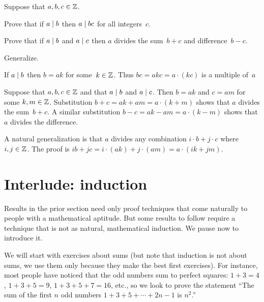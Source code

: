 \documentclass{ibl}
\begin{document}
\begin{ex}  \label{ex:DividesAndLinearCombinations}
Suppose that $a,b,c\in\mathbb{Z}$.
\begin{exes}
\item Prove that if $a\mid b$ then $a\mid bc$ for all integers~$c$.
\item Prove that if $a\mid b$ and $a\mid c$ then $a$ divides the 
  sum~$b+c$ and difference~$b-c$.
\item Generalize.
\end{exes}
\begin{ans}
\begin{exes}
\item If $a\mid b$ then $b=ak$ for some~$k\in\mathbb{Z}$.
  Thus $bc=akc=a\cdot(kc)$ is a multiple of~$a$
\item Suppose that $a,b,c\in\mathbb{Z}$ and that $a\mid b$ and $a\mid c$.
  Then $b=ak$ and $c=am$ for some $k,m\in\mathbb{Z}$. 
  Substitution  
  $b+c=ak+am=a\cdot(k+m)$
  shows that $a$ divides the sum~$b+c$.
  A similar substitution
  $b-c=ak-am=a\cdot(k-m)$
  shows that $a$ divides the difference.
\item A natural generalization is that $a$ divides any combination
  $i\cdot b+j\cdot c$ where $i,j\in\mathbb{Z}$.
  The proof is
  $ib+jc=i\cdot (ak)+j\cdot(am)=a\cdot(ik+jm)$.
\end{exes}
\end{ans}
\end{ex}




\section{Interlude: induction}
Results in the prior section need only proof techniques that come naturally
to people with a mathematical aptitude.
But some results to follow require a technique 
that is not as natural, mathematical induction.
We pause now to introduce it.

We will start with exercises about sums 
(but note that induction is not about sums,
we use them only because they make the best first exercises).
For instance, most people have noticed that the odd numbers sum to 
perfect squares: $1+3=4$, $1+3+5=9$, $1+3+5+7=16$, etc.,
so we look to prove 
the statement 
``The sum of the first $n$ odd numbers $1+3+5+\cdots+2n-1$ is $n^2$.'' 
\end{document}
